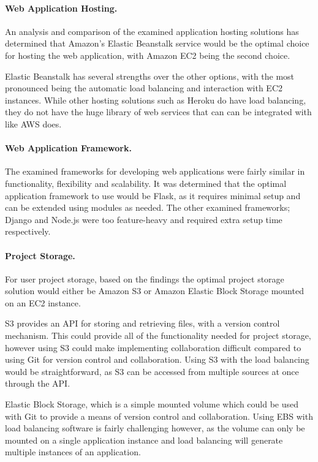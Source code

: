 \paragraph{Web Application Hosting.}
An analysis and comparison of the examined application hosting solutions has determined that Amazon's Elastic Beanstalk service would be the optimal choice for hosting the web application, with Amazon EC2 being the second choice.

Elastic Beanstalk has several strengths over the other options, with the most pronounced being the automatic load balancing and interaction with EC2 instances. While other hosting solutions such as Heroku do have load balancing, they do not have the huge library of web services that can can be integrated with like AWS does.

\paragraph{Web Application Framework.}
The examined frameworks for developing web applications were fairly similar in functionality, flexibility and scalability. It was determined that the optimal application framework to use would be Flask, as it requires minimal setup and can be extended using modules as needed. The other examined frameworks; Django and Node.js were too feature-heavy and required extra setup time respectively.

\paragraph{Project Storage.}
For user project storage, based on the findings the optimal project storage solution would either be Amazon S3 or Amazon Elastic Block Storage mounted on an EC2 instance.

S3 provides an API for storing and retrieving files, with a version control mechanism. This could provide all of the functionality needed for project storage, however using S3 could make implementing collaboration difficult compared to using Git for version control and collaboration. Using S3 with the load balancing would be straightforward, as S3 can be accessed from multiple sources at once through the API.

Elastic Block Storage, which is a simple mounted volume which could be used with Git to provide a means of version control and collaboration. Using EBS with load balancing software is fairly challenging however, as the volume can only be mounted on a single application instance and load balancing will generate multiple instances of an application.

